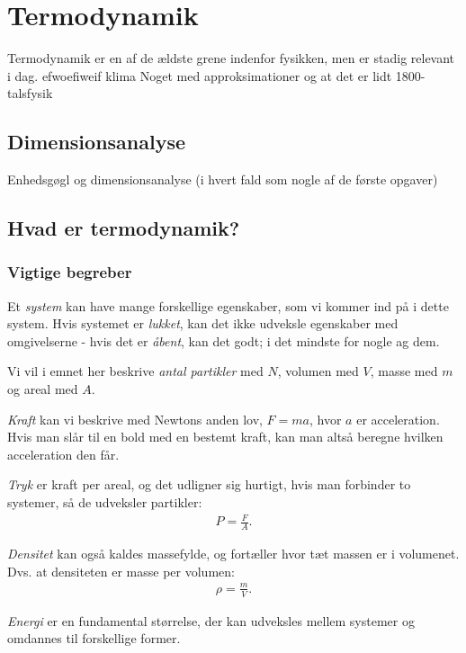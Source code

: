 \documentclass[crop=false, class=memoir]{standalone}
\begin{document}
\chapter{Termodynamik}

Termodynamik er en af de ældste grene indenfor fysikken, men er stadig relevant i dag. efwoefiweif klima
Noget med approksimationer og at det er lidt 1800-talsfysik

\section{Dimensionsanalyse}
Enhedsgøgl og dimensionsanalyse (i hvert fald som nogle af de første opgaver)

\section{Hvad er termodynamik?}

\subsection{Vigtige begreber}
Et \emph{system} kan have mange forskellige egenskaber, som vi kommer ind på i dette system. Hvis systemet er \emph{lukket}, kan det ikke udveksle egenskaber med omgivelserne - hvis det er \emph{åbent}, kan det godt; i det mindste for nogle ag dem.

Vi vil i emnet her beskrive \emph{antal partikler} med $N$, volumen med $V$, masse med $m$ og areal med $A$. 

\emph{Kraft} kan vi beskrive med Newtons anden lov,
$F = m a$,
hvor $a$ er acceleration. Hvis man slår til en bold med en bestemt kraft, kan man altså beregne hvilken acceleration den får. 

\emph{Tryk} er kraft per areal, og det udligner sig hurtigt, hvis man forbinder to systemer, så de udveksler partikler:
\begin{align}
    P = \frac{F}{A}.
\end{align}

\emph{Densitet} kan også kaldes massefylde, og fortæller hvor tæt massen er i volumenet. Dvs. at densiteten er masse per volumen:
\begin{align}
    \rho = \frac{m}{V}.
\end{align}

\emph{Energi} er en fundamental størrelse, der kan udveksles mellem systemer og omdannes til forskellige former. 
\end{document}
